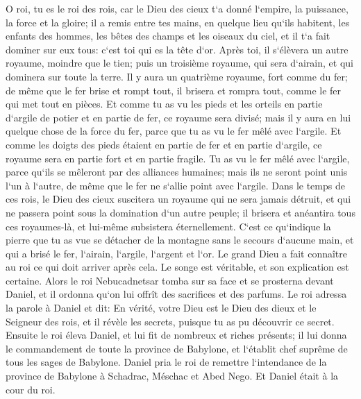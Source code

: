 \verse O roi, tu es le roi des rois, car le Dieu des cieux t`a donné l`empire, la puissance, la force et la gloire; 
\verse il a remis entre tes mains, en quelque lieu qu`ils habitent, les enfants des hommes, les bêtes des champs et les oiseaux du ciel, et il t`a fait dominer sur eux tous: c`est toi qui es la tête d`or. 
\verse Après toi, il s`élèvera un autre royaume, moindre que le tien; puis un troisième royaume, qui sera d`airain, et qui dominera sur toute la terre. 
\verse Il y aura un quatrième royaume, fort comme du fer; de même que le fer brise et rompt tout, il brisera et rompra tout, comme le fer qui met tout en pièces. 
\verse Et comme tu as vu les pieds et les orteils en partie d`argile de potier et en partie de fer, ce royaume sera divisé; mais il y aura en lui quelque chose de la force du fer, parce que tu as vu le fer mêlé avec l`argile. 
\verse Et comme les doigts des pieds étaient en partie de fer et en partie d`argile, ce royaume sera en partie fort et en partie fragile. 
\verse Tu as vu le fer mêlé avec l`argile, parce qu`ils se mêleront par des alliances humaines; mais ils ne seront point unis l`un à l`autre, de même que le fer ne s`allie point avec l`argile. 
\verse Dans le temps de ces rois, le Dieu des cieux suscitera un royaume qui ne sera jamais détruit, et qui ne passera point sous la domination d`un autre peuple; il brisera et anéantira tous ces royaumes-là, et lui-même subsistera éternellement. 
\verse C`est ce qu`indique la pierre que tu as vue se détacher de la montagne sans le secours d`aucune main, et qui a brisé le fer, l`airain, l`argile, l`argent et l`or. Le grand Dieu a fait connaître au roi ce qui doit arriver après cela. Le songe est véritable, et son explication est certaine. 
\verse Alors le roi Nebucadnetsar tomba sur sa face et se prosterna devant Daniel, et il ordonna qu`on lui offrît des sacrifices et des parfums. 
\verse Le roi adressa la parole à Daniel et dit: En vérité, votre Dieu est le Dieu des dieux et le Seigneur des rois, et il révèle les secrets, puisque tu as pu découvrir ce secret. 
\verse Ensuite le roi éleva Daniel, et lui fit de nombreux et riches présents; il lui donna le commandement de toute la province de Babylone, et l`établit chef suprême de tous les sages de Babylone. 
\verse Daniel pria le roi de remettre l`intendance de la province de Babylone à Schadrac, Méschac et Abed Nego. Et Daniel était à la cour du roi. 

